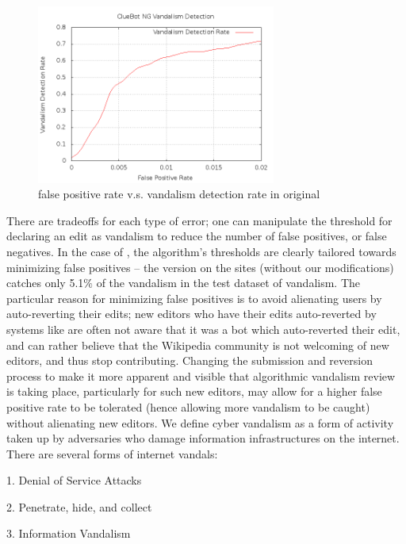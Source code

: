 \begin{figure}[t]
\centering
\includegraphics[width=0.7\textwidth]{figs/falsepositives-prev.png}
\vspace{-1em}
\caption{false positive rate v.s. vandalism detection rate in original \sys}
\label{f:falsepositives-prev}
\end{figure}

There are tradeoffs for each type of error; one can manipulate the threshold for declaring an edit as vandalism to reduce the number of false positives, or false negatives. In the case of \sys, the algorithm's thresholds are clearly tailored towards minimizing false positives -- the version on the sites (without our modifications) catches only 5.1$\%$ of the vandalism in the test dataset of vandalism. The particular reason for minimizing false positives is to avoid alienating users by auto-reverting their edits; new editors who have their edits auto-reverted by systems like \sys are often not aware that it was a bot which auto-reverted their edit, and can rather believe that the Wikipedia community is not welcoming of new editors, and thus stop contributing. Changing the submission and reversion process to make it more apparent and visible that algorithmic vandalism review is taking place, particularly for such new editors, may allow for a higher false positive rate to be tolerated (hence allowing more vandalism to be caught) without alienating new editors.
We define cyber vandalism as a form of activity taken up by adversaries who damage information infrastructures on the internet. There are several forms of internet vandals:

\begin{CompactItemize}
\item[1.]
Denial of Service Attacks
\item[2.]
Penetrate, hide, and collect
\item[3.]
Information Vandalism
\end{CompactItemize}

